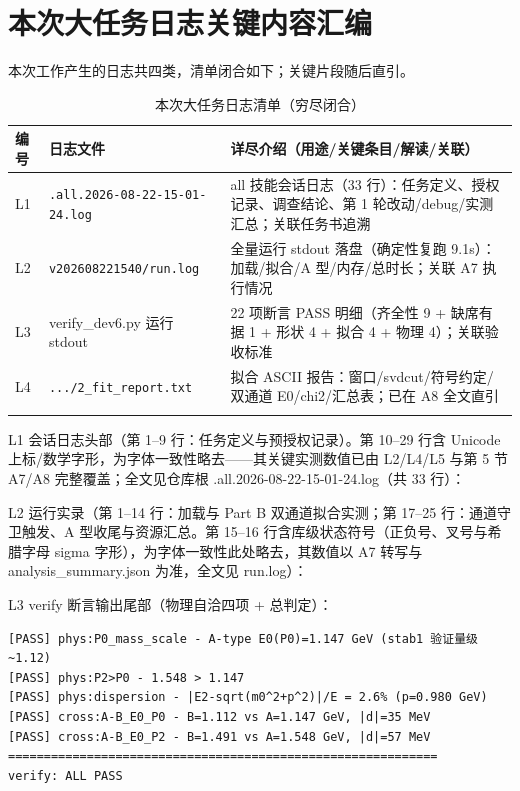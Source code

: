 \documentclass[UTF8]{ctexart}
\begin{document}
\section{本次大任务日志关键内容汇编}
本次工作产生的日志共四类，清单闭合如下；关键片段随后直引。
\begin{xltabular}{\textwidth}{llX}
\toprule
编号 & 日志文件 & 详尽介绍（用途/关键条目/解读/关联） \\
\midrule
\endhead
L1 & \texttt{\nolinkurl{.all.2026-08-22-15-01-24.log}} & all 技能会话日志（33 行）：任务定义、授权记录、调查结论、第 1 轮改动/debug/实测汇总；关联任务书追溯 \\
L2 & \texttt{\nolinkurl{v202608221540/run.log}} & 全量运行 stdout 落盘（确定性复跑 9.1s）：加载/拟合/A 型/内存/总时长；关联 A7 执行情况 \\
L3 & verify\_dev6.py 运行 stdout & 22 项断言 PASS 明细（齐全性 9 + 缺席有据 1 + 形状 4 + 拟合 4 + 物理 4）；关联验收标准 \\
L4 & \texttt{\nolinkurl{.../2\_fit\_report.txt}} & 拟合 ASCII 报告：窗口/svdcut/符号约定/双通道 E0/chi2/汇总表；已在 A8 全文直引 \\
\bottomrule
\caption{本次大任务日志清单（穷尽闭合）}
\end{xltabular}

L1 会话日志头部（第 1--9 行：任务定义与预授权记录）。第 10--29 行含 Unicode 上标/数学字形，为字体一致性略去——其关键实测数值已由 L2/L4/L5 与第 5 节 A7/A8 完整覆盖；全文见仓库根 .all.2026-08-22-15-01-24.log（共 33 行）：


L2 运行实录（第 1--14 行：加载与 Part B 双通道拟合实测；第 17--25 行：通道守卫触发、A 型收尾与资源汇总。第 15--16 行含库级状态符号（正负号、叉号与希腊字母 sigma 字形），为字体一致性此处略去，其数值以 A7 转写与 analysis\_summary.json 为准，全文见 run.log）：



L3 verify 断言输出尾部（物理自洽四项 + 总判定）：
\begin{lstlisting}[language={}]
[PASS] phys:P0_mass_scale - A-type E0(P0)=1.147 GeV (stab1 验证量级 ~1.12)
[PASS] phys:P2>P0 - 1.548 > 1.147
[PASS] phys:dispersion - |E2-sqrt(m0^2+p^2)|/E = 2.6% (p=0.980 GeV)
[PASS] cross:A-B_E0_P0 - B=1.112 vs A=1.147 GeV, |d|=35 MeV
[PASS] cross:A-B_E0_P2 - B=1.491 vs A=1.548 GeV, |d|=57 MeV
============================================================
verify: ALL PASS
\end{lstlisting}
\end{document}
